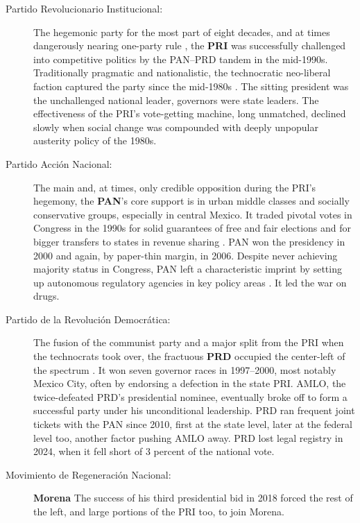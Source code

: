 \documentclass[letter,12pt]{article}
\begin{document}
\begin{description}

\item[Partido Revolucionario Institucional:] The hegemonic party for the most part of eight decades, and at times dangerously nearing one-party rule \citep{molinar.1991a}, the \textbf{PRI} was successfully challenged into competitive politics by the PAN--PRD tandem in the mid-1990s. Traditionally pragmatic and nationalistic, the technocratic neo-liberal faction captured the party since the mid-1980s \citep{dresser.Neolib1991}. The sitting president was the unchallenged national leader, governors were state leaders. The effectiveness of the PRI's vote-getting machine, long unmatched, declined slowly when social change was compounded with deeply unpopular austerity policy of the 1980s. 

\item[Partido Acción Nacional:] The main and, at times, only credible opposition during the PRI's hegemony, the \textbf{PAN}'s core support is in urban middle classes and socially conservative groups, especially in central Mexico. It traded pivotal votes in Congress in the 1990s for solid guarantees of free and fair elections \citep{cornelius.1996} and for bigger transfers to states in revenue sharing \citep{diaz.cayeros.2006}. PAN won the presidency in 2000 and again, by paper-thin margin, in 2006. Despite never achieving majority status in Congress, PAN left a characteristic imprint by setting up autonomous regulatory agencies in key policy areas \citep[telecomms, energy, education, antitrust, freedom of information, and more; see][]{magar.estevez.rosas.2010}. It led the war on drugs.

\item[Partido de la Revolución Democrática:] The fusion of the communist party and a major split from the PRI when the technocrats took over, the fractuous \textbf{PRD} occupied the center-left of the spectrum \citep{bruhn.1997,cantuCSG2019apsr}. It won seven governor races in 1997--2000, most notably Mexico City, often by endorsing a defection in the state PRI. AMLO, the twice-defeated PRD's presidential nominee, eventually broke off to form a successful party under his unconditional leadership. PRD ran frequent joint tickets with the PAN since 2010, first at the state level, later at the federal level too, another factor pushing AMLO away. PRD lost legal registry in 2024, when it fell short of 3 percent of the national vote. 

 
  
\item[Movimiento de Regeneración Nacional:] \textbf{Morena} The success of his third presidential bid in 2018 forced the rest of the left, and large portions of the PRI too, to join Morena. 

\end{description}
\end{document}
